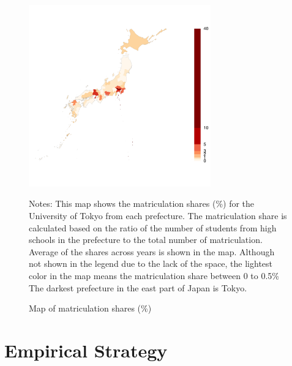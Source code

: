 \documentclass[12pt,letterpaper]{article}
\begin{document}
\begin{figure}[H]
  \centering
  \caption{Map of matriculation shares (\%)}
  \includegraphics[width = 0.7\textwidth]{../Output/images/admission_map.pdf}
  \label{fig:admission_map}
  \footnotesize
  \begin{tablenotes}
    \item Notes:
      This map shows the matriculation shares (\%) for the University of Tokyo from each prefecture.
      The matriculation share is calculated based on the ratio of the number of students from high schools in the prefecture to the total number of matriculation.
      Average of the shares across years is shown in the map.
      Although not shown in the legend due to the lack of the space, the lightest color in the map means the matriculation share between 0 to 0.5\% 
      The darkest prefecture in the east part of Japan is Tokyo.
  \end{tablenotes}
\end{figure}

\section{Empirical Strategy}\label{sec:empirical_strategy}
\end{document}
